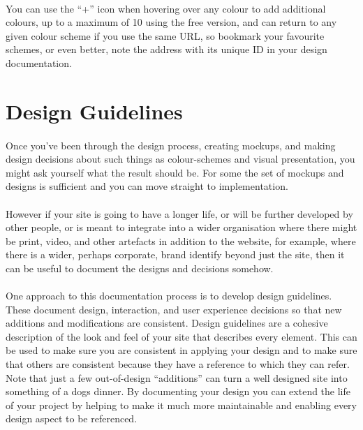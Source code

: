 \paragraph{} You can use the ``+'' icon when hovering over any colour to add additional colours, up to a maximum of 10 using the free version, and can return to any given colour scheme if you use the same URL, so bookmark your favourite schemes, or even better, note the address with its unique ID in your design documentation.



\section{Design Guidelines}
\paragraph{} Once you've been through the design process, creating mockups, and making design decisions about such things as colour-schemes and visual presentation, you might ask yourself what the result should be. For some the set of mockups and designs is sufficient and you can move straight to implementation.
\paragraph{} However if your site is going to have a longer life, or will be further developed by other people, or is meant to integrate into a wider organisation where there might be print, video, and other artefacts in addition to the website, for example, where there is a wider, perhaps corporate, brand identify beyond just the site, then it can be useful to document the designs and decisions somehow.
\paragraph{} One approach to this documentation process is to develop design guidelines. These document design, interaction, and user experience decisions so that new additions and modifications are consistent. Design guidelines are a cohesive description of the look and feel of your site that describes every element. This can be used to make sure you are consistent in applying your design and to make sure that others are consistent because they have a reference to which they can refer. Note that just a few out-of-design ``additions'' can turn a well designed site into something of a dogs dinner. By documenting your design you can extend the life of your project by helping to make it much more maintainable and enabling every design aspect to be referenced.
